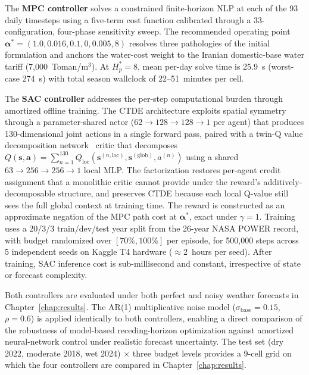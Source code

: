 The \textbf{MPC controller} solves a constrained finite-horizon NLP at each
of the 93 daily timesteps using a five-term cost function calibrated through
a 33-configuration, four-phase sensitivity sweep. The recommended operating
point $\boldsymbol{\alpha}^* = (1.0, 0.016, 0.1, 0, 0.005, 8)$ resolves
three pathologies of the initial formulation and anchors the water-cost weight
to the Iranian domestic-base water tariff (7{,}000~Toman/m$^3$). At
$H_p^* = 8$, mean per-day solve time is 25.9~s (worst-case 274~s) with
total season wallclock of 22--51~minutes per cell.

The \textbf{SAC controller} addresses the per-step computational burden
through amortized offline training. The CTDE architecture exploits spatial
symmetry through a parameter-shared actor ($62 \to 128 \to 128 \to 1$ per
agent) that produces 130-dimensional joint actions in a single forward pass,
paired with a twin-Q value decomposition network~\cite{sunehag2018vdn}
critic that decomposes $Q(\mathbf{s},\mathbf{a}) = \sum_{n=1}^{130}
Q_{\mathrm{loc}}(\mathbf{s}^{(n,\mathrm{loc})}, \mathbf{s}^{(\mathrm{glob})},
a^{(n)})$ using a shared $63 \to 256 \to 256 \to 1$ local MLP. The
factorization restores per-agent credit assignment that a monolithic critic
cannot provide under the reward's additively-decomposable structure, and
preserves CTDE because each local Q-value still sees the full global context
at training time. The reward is constructed as an approximate negation of
the MPC path cost at $\boldsymbol{\alpha}^*$, exact under $\gamma = 1$. Training uses a 20/3/3
train/dev/test year split from the 26-year NASA POWER record, with budget
randomized over $[70\%, 100\%]$ per episode, for 500{,}000 steps across
5 independent seeds on Kaggle T4 hardware ($\approx$2~hours per seed).
After training, SAC inference cost is sub-millisecond and constant,
irrespective of state or forecast complexity.

Both controllers are evaluated under both perfect and noisy weather forecasts
in Chapter~\ref{chap:results}. The AR(1) multiplicative noise model
($\sigma_{\mathrm{base}} = 0.15$, $\rho = 0.6$) is applied identically to
both controllers, enabling a direct comparison of the robustness of model-based
receding-horizon optimization against amortized neural-network control under
realistic forecast uncertainty. The test set (dry 2022, moderate 2018,
wet 2024) $\times$ three budget levels provides a 9-cell grid on which the
four controllers are compared in Chapter~\ref{chap:results}.
